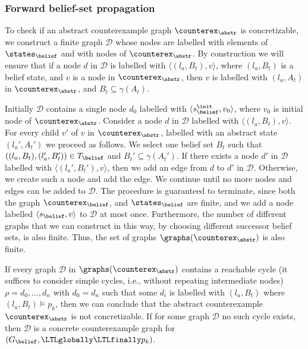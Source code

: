 \subsubsection{Forward belief-set propagation}

To check if an abstract counterexample graph $\counterex_\abstr$ is concretizable, we construct a finite graph $\mathcal{D}$ whose nodes are labelled with elements of $\states_\belief$ and with nodes of $\counterex_\abstr$.
By construction we will ensure that if a node $d$ in $\mathcal D$ is labelled with $\langle(l_a,B_t),v \rangle$, where $(l_a,B_t)$ is a belief state, and $v$ is a node in $\counterex_\abstr$, then $v$ is labelled with $(l_a,A_t)$ in $\counterex_\abstr$, and $B_t \subseteq \gamma(A_t)$. 

Initially $\mathcal D$ contains a single node $d_0$ labelled with $\langle s_\belief^\init,v_0\rangle$, where $v_0$ is initial node of $\counterex_\abstr$. Consider a node $d$ in $\mathcal D$ labelled with $\langle(l_a,B_t),v \rangle$. For every child $v'$ of $v$ in $\counterex_\abstr$, labelled with an abstract state $(l_a',A_t')$ we proceed as follows. We select one belief set $B_t$ such that $((l_a,B_t),(l_a',B_t')) \in T_\belief$ and $B_t' \subseteq \gamma(A_t')$. If there exists a node $d'$ in $\mathcal D$ labelled with $\langle (l_a',B_t'),v\rangle$, then we add an edge from $d$ to $d'$ in $\mathcal{D}$. Otherwise, we create such a node and add the edge. We continue until no more nodes and edges can be added to $\mathcal D$. The procedure is guaranteed to terminate, since both  the graph $\counterex_\belief$, and $\states_\belief$ are finite, and we add a node labelled $\langle s_\belief, v\rangle$ to $\mathcal D$ at most once. Furthermore, the number of different graphs that we can construct in this way, by choosing different successor belief sets, is also finite. Thus, the set of graphs $\graphs(\counterex_\abstr)$ is also finite.

If every graph $\mathcal D$ in $\graphs(\counterex_\abstr)$ contains a reachable cycle (it suffices to consider simple cycles, i.e., without repeating intermediate nodes) $\rho = d_0,\ldots,d_n$ with $d_0 = d_n$ such that some $d_i$ is labelled with $(l_a,B_t)$ where $(l_a,B_t) \models p_k$, then we can conclude that the abstract counterexample $\counterex_\abstr$ is not concretizable. If for some graph $\mathcal D$ no such cycle exists, then $\mathcal D$ is a concrete counterexample graph for $(G_\belief,\LTLglobally\LTLfinally p_k)$. 

